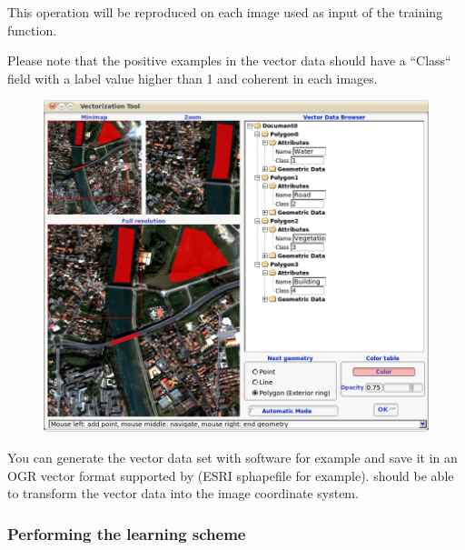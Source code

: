 This operation will be reproduced on each image used as input of the training
function.

Please note that the positive examples in the vector data should have a ``Class``
field with a label value higher than 1 and coherent in each images.

\begin{figure}
  \center
  \includegraphics[width=1\textwidth]{../Art/MonteverdiImages/monteverdi_vectorization_module_for_classification.png}
  \label{fig:vectoModuleDataSetCreation}
\end{figure}

You can generate the vector data set with \qgis software for
example and save it in an OGR vector format supported by \gdal (ESRI
sphapefile for example). \app should be able to transform the
vector data into the image coordinate system.

\subsubsection{Performing the learning scheme}

